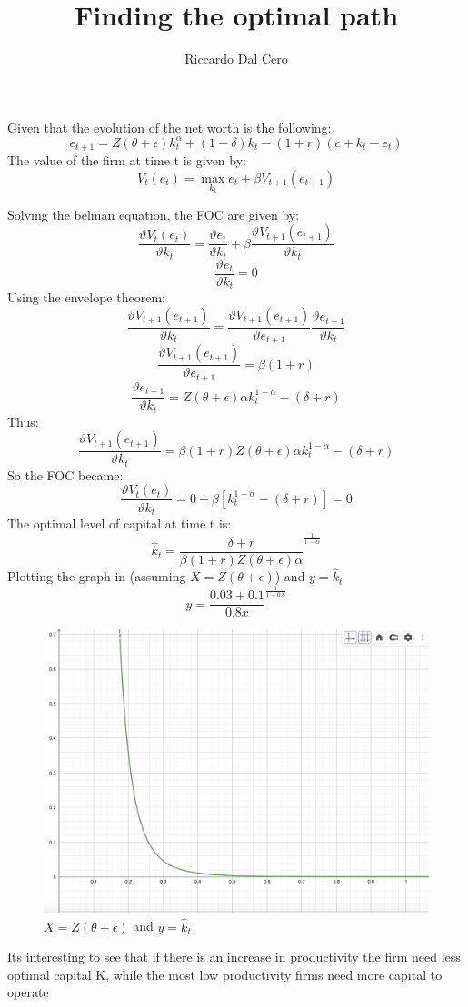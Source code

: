 \documentclass{article}
\title{Finding the optimal path}
\author{Riccardo Dal Cero}
\begin{document}
\maketitle

Given that the evolution of the net worth is the following:
\[e_{t+1} = Z(\theta +\epsilon)k_t^\alpha + (1-\delta )k_t - (1+r)(c+k_t-e_t)\]
The value of the firm at time t is given by:
\[V_t(e_t) =\max_{k_t}  e_t + \beta V_{t+1}(e_{t+1})\]

Solving the belman equation, the FOC are given by:
\[\frac{\vartheta V_t(e_t)}{\vartheta k_t } =\frac{\vartheta e_t}{\vartheta k_t } +
 \beta \frac{\vartheta V_{t+1}(e_{t+1})}{\vartheta k_t } \]
\[\frac{\vartheta e_t}{\vartheta k_t} = 0\]
Using the envelope theorem:
\[\frac{\vartheta
V_{t+1}(e_{t+1})}{\vartheta k_t } = \frac{\vartheta
V_{t+1}(e_{t+1})}{\vartheta e_{t+1} }\frac{\vartheta e_{t+1}}{\vartheta k_t}\]
\[\frac{\vartheta V_{t+1}(e_{t+1})}{\vartheta e_{t+1} } = \beta(1+r)\]
\[\frac{\vartheta e_{t+1}}{\vartheta k_t} = Z(\theta +\epsilon)\alpha k_t^{1-\alpha}
-(\delta + r)\]
Thus:
\[\frac{\vartheta V_{t+1}(e_{t+1})}{\vartheta k_t } = 
\beta(1+r) Z(\theta +\epsilon)\alpha k_t^{1-\alpha}-(\delta + r) \]
So the FOC became:
\[\frac{\vartheta V_t(e_t)}{\vartheta k_t } = 0 + \beta [ k_t^{1-\alpha}-(\delta + r)] = 0 \]
The optimal level of capital at time t is:
\[\widehat{k} _t= {\frac{\delta + r}{\beta(1+r) Z(\theta +\epsilon)\alpha}}^{\frac{1}{1-\alpha}} \]
Plotting the graph in (assuming \(X=Z(\theta +\epsilon)\)) and \(y=\widehat{k} _t\)
\[ y={\frac{0.03+0.1}{0.8 x}}^{\frac{1}{1-0.8}}\]

\begin{figure}
    \centering
    \includegraphics[scale = 0.4]{K.png}
    \caption{\(X=Z(\theta +\epsilon)\) and \(y=\widehat{k} _t\) }
    \label{plot:k_static}
\end{figure}
Its interesting to see that if there is an increase in productivity the firm need less optimal capital K, while the most
low productivity firms need more capital to operate 
\end{document}
